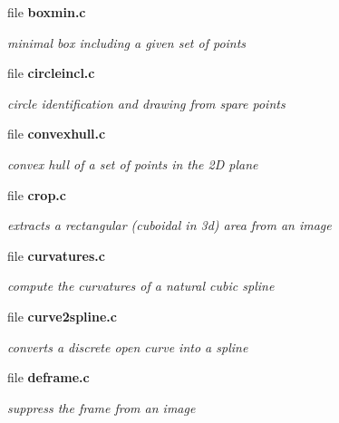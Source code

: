\begin{CompactItemize}
\item 
file \bf{boxmin.c}
\begin{CompactList}\small\item\em minimal box including a given set of points \item\end{CompactList}

\item 
file \bf{circleincl.c}
\begin{CompactList}\small\item\em circle identification and drawing from spare points \item\end{CompactList}

\item 
file \bf{convexhull.c}
\begin{CompactList}\small\item\em convex hull of a set of points in the 2D plane \item\end{CompactList}

\item 
file \bf{crop.c}
\begin{CompactList}\small\item\em extracts a rectangular (cuboidal in 3d) area from an image \item\end{CompactList}

\item 
file \bf{curvatures.c}
\begin{CompactList}\small\item\em compute the curvatures of a natural cubic spline \item\end{CompactList}

\item 
file \bf{curve2spline.c}
\begin{CompactList}\small\item\em converts a discrete open curve into a spline \item\end{CompactList}

\item 
file \bf{deframe.c}
\begin{CompactList}\small\item\em suppress the frame from an image \item\end{CompactList}


\end{CompactItemize}

